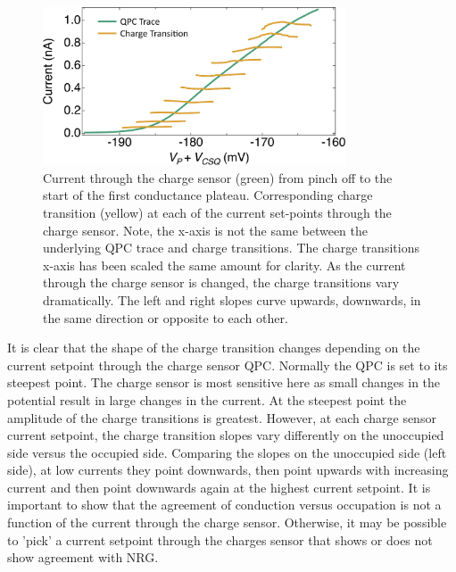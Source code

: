 \begin{figure}[!bht]
  \begin{center}
    \includegraphics[width=0.8\textwidth]{figures/ch3/crop_FiguresMaster.016.png}
    \caption[Charge transitions measured at various current set points through the charge sensor]{\label{fig:ch3/cond_occ_ct_set-points} 
    Current through the charge sensor (green) from pinch off to the start of the first conductance plateau. Corresponding charge transition (yellow) at each of the current set-points through the charge sensor. Note, the x-axis is not the same between the underlying QPC trace and charge transitions. The charge transitions x-axis has been scaled the same amount for clarity. As the current through the charge sensor is changed, the charge transitions vary dramatically. The left and right slopes curve upwards, downwards, in the same direction or opposite to each other.}
  \end{center}
\end{figure}
\FloatBarrier

It is clear that the shape of the charge transition changes depending on the current setpoint through the charge sensor QPC. Normally the QPC is set to its steepest point. The charge sensor is most sensitive here as small changes in the potential result in large changes in the current. At the steepest point the amplitude of the charge transitions is greatest. However, at each charge sensor current setpoint, the charge transition slopes vary differently on the unoccupied side versus the occupied side. Comparing the slopes on the unoccupied side (left side), at low currents they point downwards, then point upwards with increasing current and then point downwards again at the highest current setpoint. It is important to show that the agreement of conduction versus occupation is not a function of the current through the charge sensor. Otherwise, it may be possible to 'pick' a current setpoint through the charges sensor that shows or does not show agreement with NRG. 

